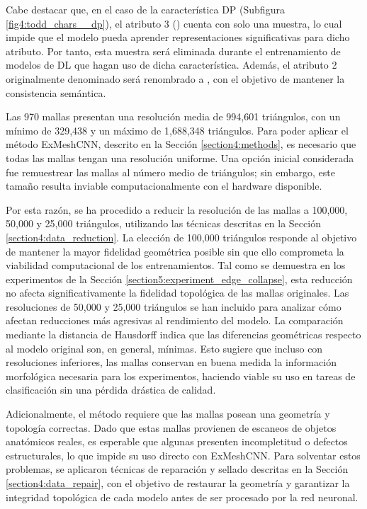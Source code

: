 Cabe destacar que, en el caso de la característica DP (Subfigura \ref{fig4:todd_chars__dp}), el atributo 3 () cuenta con solo una muestra, lo cual impide que el modelo pueda aprender representaciones significativas para dicho atributo. Por tanto, esta muestra será eliminada durante el entrenamiento de modelos de DL que hagan uso de dicha característica. Además, el atributo 2 originalmente denominado  será renombrado a , con el objetivo de mantener la consistencia semántica.

Las 970 mallas presentan una resolución media de 994,601 triángulos, con un mínimo de 329,438 y un máximo de 1,688,348 triángulos. Para poder aplicar el método ExMeshCNN, descrito en la Sección \ref{section4:methods}, es necesario que todas las mallas tengan una resolución uniforme. Una opción inicial considerada fue remuestrear las mallas al número medio de triángulos; sin embargo, este tamaño resulta inviable computacionalmente con el hardware disponible.

Por esta razón, se ha procedido a reducir la resolución de las mallas a 100,000, 50,000 y 25,000 triángulos, utilizando las técnicas descritas en la Sección \ref{section4:data_reduction}. La elección de 100,000 triángulos responde al objetivo de mantener la mayor fidelidad geométrica posible sin que ello comprometa la viabilidad computacional de los entrenamientos. Tal como se demuestra en los experimentos de la Sección \ref{section5:experiment_edge_collapse}, esta reducción no afecta significativamente la fidelidad topológica de las mallas originales. Las resoluciones de 50,000 y 25,000 triángulos se han incluido para analizar cómo afectan reducciones más agresivas al rendimiento del modelo. La comparación mediante la distancia de Hausdorff indica que las diferencias geométricas respecto al modelo original son, en general, mínimas. Esto sugiere que incluso con resoluciones inferiores, las mallas conservan en buena medida la información morfológica necesaria para los experimentos, haciendo viable su uso en tareas de clasificación sin una pérdida drástica de calidad.

Adicionalmente, el método requiere que las mallas posean una geometría y topología correctas. Dado que estas mallas provienen de escaneos de objetos anatómicos reales, es esperable que algunas presenten incompletitud o defectos estructurales, lo que impide su uso directo con ExMeshCNN. Para solventar estos problemas, se aplicaron técnicas de reparación y sellado descritas en la Sección \ref{section4:data_repair}, con el objetivo de restaurar la geometría y garantizar la integridad topológica de cada modelo antes de ser procesado por la red neuronal.

